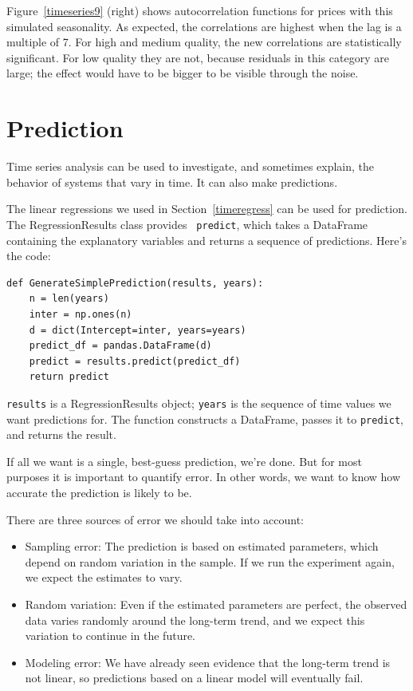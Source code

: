 \documentclass[12pt]{book}
\theoremstyle{exercise}
\begin{document}
Figure~\ref{timeseries9} (right) shows autocorrelation functions for
prices with this simulated seasonality.  As expected, the
correlations are highest when the lag is a multiple of 7.  For
high and medium quality, the new correlations are statistically
significant.  For low quality they are not, because residuals in this
category are large; the effect would have to be bigger
to be visible through the noise.%
%
%
%


\section{Prediction}  

Time series analysis can be used to investigate, and sometimes
explain, the behavior of systems that vary in time.  It can also
make predictions.%

The linear regressions we used in Section~\ref{timeregress} can be
used for prediction.  The RegressionResults class provides {\tt
  predict}, which takes a DataFrame containing the explanatory
variables and returns a sequence of predictions.  Here's the code:%
%

\begin{verbatim}
def GenerateSimplePrediction(results, years):
    n = len(years)
    inter = np.ones(n)
    d = dict(Intercept=inter, years=years)
    predict_df = pandas.DataFrame(d)
    predict = results.predict(predict_df)
    return predict
\end{verbatim}

{\tt results} is a RegressionResults object; {\tt years} is the
sequence of time values we want predictions for.  The function
constructs a DataFrame, passes it to {\tt predict}, and
returns the result.%
%

If all we want is a single, best-guess prediction, we're done.  But
for most purposes it is important to quantify error.  In other words,
we want to know how accurate the prediction is likely to be.

There are three sources of error we should take into account:

\begin{itemize}

\item Sampling error: The prediction is based on estimated
parameters, which depend on random variation
in the sample.  If we run the experiment again, we expect
the estimates to vary.%
%

\item Random variation:  Even if the estimated parameters are
perfect, the observed data varies randomly around the long-term
trend, and we expect this variation to continue in the future.%

\item Modeling error: We have already seen evidence that the long-term
trend is not linear, so predictions based on a linear model will
eventually fail.%

\end{itemize}
\end{document}
